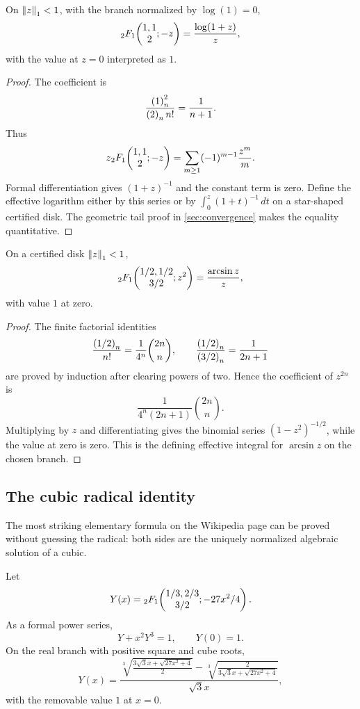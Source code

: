 \begin{theorem}[Logarithm]\label{thm:log-special}
On \(\left\lVert z\right\rVert_1<1\), with the branch normalized by \(\log(1)=0\),
\[
 {}_2F_1\!\left(\begin{matrix}1,1\\2\end{matrix};-z\right)=\frac{\log(1+z)}z,
\]
with the value at \(z=0\) interpreted as \(1\).
\end{theorem}

\begin{proof}
The coefficient is
\[
 \frac{\left(1\right)_{n}^2}{\left(2\right)_{n} n!}=\frac1{n+1}.
\]
Thus
\[
 z{}_2F_1\!\left(\begin{matrix}1,1\\2\end{matrix};-z\right)=\sum_{m\ge1}(-1)^{m-1}\frac{z^m}{m}.
\]
Formal differentiation gives \((1+z)^{-1}\) and the constant term is zero.
Define the effective logarithm either by this series or by
\(\int_0^z(1+t)^{-1}\,dt\) on a star-shaped certified disk.  The geometric
tail proof in \cref{sec:convergence} makes the equality quantitative.
\end{proof}

\begin{theorem}[Arcsine]\label{thm:arcsin-special}
On a certified disk \(\left\lVert z\right\rVert_1<1\),
\[
 {}_2F_1\!\left(\begin{matrix}1/2,1/2\\3/2\end{matrix};z^2\right)=\frac{\arcsin z}{z},
\]
with value \(1\) at zero.
\end{theorem}

\begin{proof}
The finite factorial identities
\[
 \frac{\left(1/2\right)_{n}}{n!}=\frac1{4^n}\binom{2n}{n},
 \qquad
 \frac{\left(1/2\right)_{n}}{\left(3/2\right)_{n}}=\frac1{2n+1}
\]
are proved by induction after clearing powers of two.  Hence the coefficient
of \(z^{2n}\) is
\[
 \frac1{4^n(2n+1)}\binom{2n}{n}.
\]
Multiplying by \(z\) and differentiating gives the binomial series
\((1-z^2)^{-1/2}\), while the value at zero is zero.  This is the defining
effective integral for \(\arcsin z\) on the chosen branch.
\end{proof}

\subsection{The cubic radical identity}

The most striking elementary formula on the Wikipedia page can be proved
without guessing the radical: both sides are the uniquely normalized algebraic
solution of a cubic.

\begin{theorem}\label{thm:cubic-radical}
Let
\[
 Y(x)={}_2F_1\!\left(\begin{matrix}1/3,2/3\\3/2\end{matrix};-27x^2/4\right).
\]
As a formal power series,
\begin{equation}\label{eq:cubic-algebraic}
 Y+x^2Y^3=1,
 \qquad Y(0)=1.
\end{equation}
On the real branch with positive square and cube roots,
\begin{equation}\label{eq:cubic-radical}
Y(x)=
\frac{
 \sqrt[3]{\frac{3\sqrt3x+\sqrt{27x^2+4}}2}
 -\sqrt[3]{\frac{2}{3\sqrt3x+\sqrt{27x^2+4}}}
}{\sqrt3x},
\end{equation}
with the removable value \(1\) at \(x=0\).
\end{theorem}

